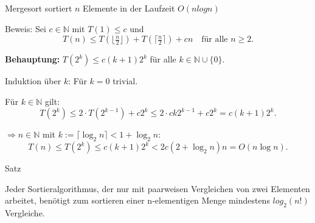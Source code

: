 \documentclass{beamer}
\begin{document}
\begin{frame}
\begin{block}{Mergesort sortiert $n$ Elemente in der Laufzeit $O(n log n)$}
\end{block}
\begin{block}{Beweis:}
Sei $c \in \mathbb{N}$ mit $T(1) \leq c$ und 
\[
T(n) \leq T(\lfloor \tfrac{n}{2} \rfloor) + T(\lceil \tfrac{n}{2} \rceil) + cn \quad \text{für alle } n \geq 2.
\]

\textbf{Behauptung:} $T(2^k) \leq c(k+1)2^k$ für alle $k \in \mathbb{N} \cup \{0\}$.

Induktion über $k$: 
Für $k = 0$ trivial. 

Für $k \in \mathbb{N}$ gilt:
\[
T(2^k) \leq 2 \cdot T(2^{k-1}) + c 2^k \leq 2 \cdot ck 2^{k-1} + c 2^k = c(k+1)2^k.
\]

$\Rightarrow   n \in \mathbb{N}$ mit $k := \lceil \log_2 n \rceil < 1 + \log_2 n$:
\[
T(n) \leq T(2^k) \leq c(k+1)2^k < 2c(2 + \log_2 n)n = O(n \log n).
\]

\end{block}
\end{frame}
\begin{frame}{Satz}
\begin{block}{}
Jeder Sortieralgorithmus, der nur mit paarweisen Vergleichen von zwei Elementen arbeitet, benötigt zum sortieren einer n-elementigen Menge mindestens $log_2(n!)$ Vergleiche.
\end{block}
\end{frame}
\end{document}
